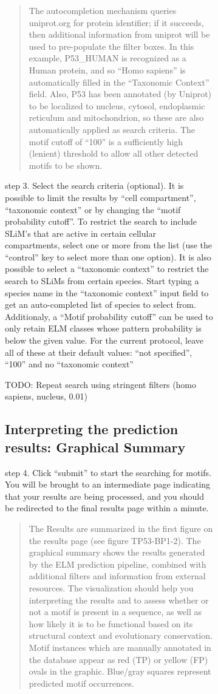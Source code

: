 {\begin{figure}[h!]
{{\begin{figure}[h!]
{{\begin{quote}
The autocompletion mechanism queries uniprot.org for protein identifier;
if it succeeds, then additional information from uniprot will be used to
pre-populate the filter boxes. In this example, P53\_HUMAN is recognized
as a Human protein, and so ``Homo sapiens'' is automatically filled in
the ``Taxonomic Context'' field. Also, P53 has been annotated (by
Uniprot) to be localized to nucleus, cytosol, endoplasmic reticulum and
mitochondrion, so these are also automatically applied as search
criteria. The motif cutoff of ``100'' is a sufficiently high (lenient)
threshold to allow all other detected motifs to be shown.
\end{quote}

step 3. Select the search criteria (optional). It is possible to limit
the results by ``cell compartment'', ``taxonomic context'' or by
changing the ``motif probability cutoff''. To restrict the search to
include SLiM's that are active in certain cellular compartments, select
one or more from the list (use the ``control'' key to select more than
one option). It is also possible to select a ``taxonomic context'' to
restrict the search to SLiMs from certain species. Start typing a
species name in the ``taxonomic context'' input field to get an
auto-completed list of species to select from. Additionaly, a ``Motif
probability cutoff'' can be used to only retain ELM classes whose
pattern probability is below the given value. For the current protocol,
leave all of these at their default values: ``not specified'', ``100''
and no ``taxonomic context''

TODO: Repeat search using stringent filters (homo sapiens, nucleus,
0.01)

\subsection{Interpreting the prediction results: Graphical
Summary}\label{interpreting-the-prediction-results-graphical-summary}

step 4. Click ``submit'' to start the searching for motifs. You will be
brought to an intermediate page indicating that your results are being
processed, and you should be redirected to the final results page within
a minute.

\begin{quote}
The Results are summarized in the first figure on the results page (see
figure TP53-BP1-2). The graphical summary shows the results generated by
the ELM prediction pipeline, combined with additional filters and
information from external resources. The visualization should help you
interpreting the results and to assess whether or not a motif is present
in a sequence, as well as how likely it is to be functional based on its
structural context and evolutionary conservation. Motif instances which
are manually annotated in the database appear as red (TP) or yellow (FP)
ovals in the graphic. Blue/gray squares represent predicted motif
occurrences.


\end{quote}}}
\end{figure}}}
\end{figure}}

